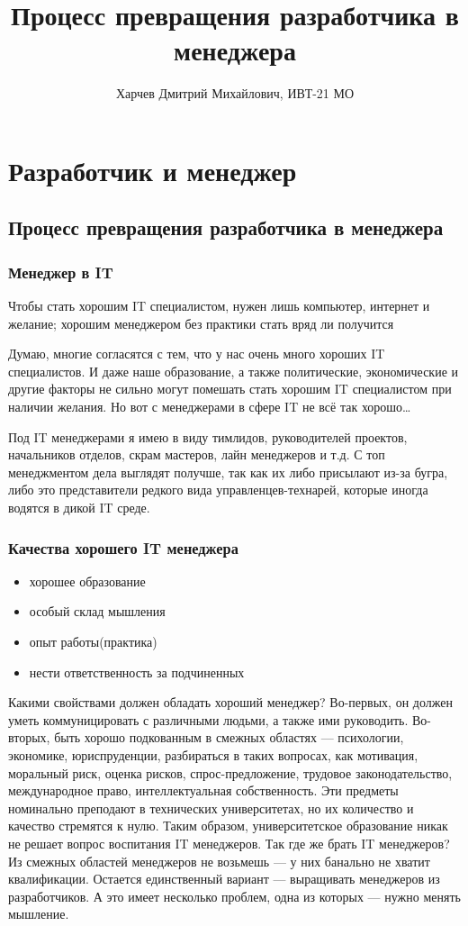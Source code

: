 \documentclass{../industrial-development}
\title{Процесс превращения разработчика в менеджера}
\author{Харчев Дмитрий Михайлович, ИВТ-21 МО}
\date{}
\begin{document}
\begin{frame}
  \titlepage
\end{frame}

\section{Разработчик и менеджер}

\subsection{Процесс превращения разработчика в менеджера}

\begin{frame} \frametitle{Менеджер в IT}
	Чтобы стать хорошим IT специалистом, нужен лишь компьютер, интернет и желание; хорошим менеджером без практики стать вряд ли получится
\end{frame}
\lecturenotes
Думаю, многие согласятся с тем, что у нас очень много хороших IT специалистов. И даже наше образование, а также политические, экономические и другие факторы не сильно могут помешать стать хорошим IT специалистом при наличии желания. Но вот с менеджерами в сфере IT не всё так хорошо…

Под IT менеджерами я имею в виду тимлидов, руководителей проектов, начальников отделов, скрам мастеров, лайн менеджеров и т.д. С топ менеджментом дела выглядят получше, так как их либо присылают из-за бугра, либо это представители редкого вида управленцев-технарей, которые иногда водятся в дикой IT среде.
~\cite{How_to_be_a_good_IT-manager}


\begin{frame} \frametitle{Качества хорошего IT менеджера}
	\begin{itemize}
		\item хорошее образование
		\item особый склад мышления
		\item опыт работы(практика)
		\item нести ответственность за подчиненных
	\end{itemize}	
\end{frame}
\lecturenotes
Какими свойствами должен обладать хороший менеджер? Во-первых, он должен уметь коммуницировать с различными людьми, а также ими руководить. Во-вторых, быть хорошо подкованным в смежных областях — психологии, экономике, юриспруденции, разбираться в таких вопросах, как мотивация, моральный риск, оценка рисков, спрос-предложение, трудовое законодательство, международное право, интеллектуальная собственность.
Эти предметы номинально преподают в технических университетах, но их количество и качество стремятся к нулю. Таким образом, университетское образование никак не решает вопрос воспитания IT менеджеров.
Так где же брать IT менеджеров? Из смежных областей менеджеров не возьмешь — у них банально не хватит квалификации.
Остается единственный вариант — выращивать менеджеров из разработчиков. А это имеет несколько проблем, одна из которых — нужно менять мышление.
\end{document}
